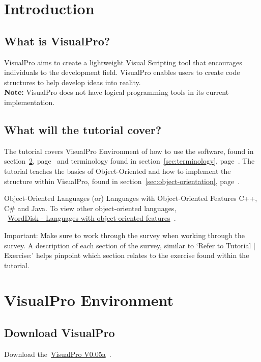 \documentclass[10pt]{article}
\begin{document}
\newpage
\section{Introduction}
    \subsection{What is VisualPro?}
        VisualPro aims to create a lightweight Visual Scripting tool that encourages individuals to the development field. VisualPro enables users to create code structures to help develop ideas into reality. \\\textbf{Note:} VisualPro does not have logical programming tools in its current implementation.

    \subsection{What will the tutorial cover?}
        The tutorial covers VisualPro Environment of how to use the software, found in section~\ref{sec:vp-env}, page~\pageref{sec:vp-env} and terminology found in section~\ref{sec:terminology}, page~\pageref{sec:terminology}.
        The tutorial teaches the basics of Object-Oriented and how to implement the structure within VisualPro, found in section~\ref{sec:object-orientation}, page~\pageref{sec:object-orientation}.
        
        \begin{example}{Object-Oriented Languages (or) Languages with Object-Oriented Features}
            C++, C\# and Java. To view other object-oriented languages,\\~\href{https://worddisk.com/wiki/List_of_object-oriented_programming_languages/}{WordDisk - Languages with object-oriented features}~\cite{word_disk_list_2018}.
        \end{example}

    \begin{tip}{Important:}
        Make sure to work through the survey when working through the survey. A description of each section of the survey, similar to `Refer to Tutorial | Exercise:' helps pinpoint which section relates to the exercise found within the tutorial.
    \end{tip}

\section{VisualPro Environment}
\label{sec:vp-env}
    \subsection{Download VisualPro}
        Download the~\href{https://github.com/ShinkuKira21/VisualPro-FinalProject/releases/tag/VP-V0.05A}{VisualPro V0.05a}~\cite{patch_visualpro_2022}.
\end{document}
